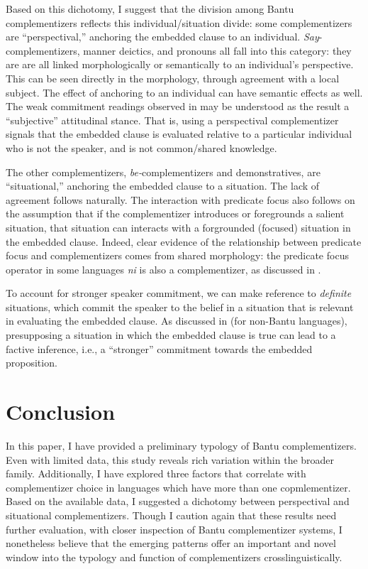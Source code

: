\documentclass[output=paper,colorlinks,citecolor=brown,
]{langscibook}
\begin{document}
Based on this dichotomy, I suggest that the division among Bantu complementizers reflects this individual/situation divide: some complementizers are ``perspectival,'' anchoring the embedded clause to an individual. \textit{Say}-complementizers, manner deictics, and pronouns all fall into this category: they are are all linked morphologically or semantically to an individual's perspective. This can be seen directly in the morphology, through agreement with a local subject. The effect of anchoring to an individual can have semantic effects as well. The weak commitment readings observed in  may be understood as  the result a ``subjective'' attitudinal stance. That is, using a perspectival complementizer signals that the embedded clause is evaluated relative to a particular individual who is not the speaker, and is not common/shared knowledge. 

The other complementizers, \textit{be-}complementizers and demonstratives, are ``situational,'' anchoring the embedded clause to a situation. The lack of agreement follows naturally. The interaction with predicate focus also follows on the assumption that if the complementizer introduces or foregrounds  a salient situation, that situation  can interacts with a forgrounded (focused) situation in the embedded clause. Indeed, clear evidence of the relationship between predicate focus and  complementizers comes from shared morphology: the predicate focus operator in some languages \textit{ni} is also a complementizer, as discussed in .



To account for stronger speaker commitment, we can make reference to \textit{definite} situations, which commit the speaker to the belief in a situation that is relevant in evaluating the embedded clause. As discussed in \citet{Ozyildiz:2017, BochnakHanink:2021} (for non-Bantu languages), presupposing a situation in which the embedded clause is true can lead to a factive inference, i.e., a ``stronger'' commitment towards the embedded proposition.

\section{Conclusion}\label{sec:gluckman:conclusion}

In this paper, I have provided a preliminary typology of Bantu complementizers. Even with limited data, this study reveals rich variation within the broader family. Additionally, I have explored three factors that correlate with complementizer choice in languages which have more than one copmlementizer. Based on the available data, I  suggested a dichotomy between perspectival and situational complementizers. Though I caution again that these results need further evaluation, with closer inspection of Bantu complementizer systems, I nonetheless believe that the emerging patterns offer an important and novel window into the typology and function of complementizers crosslinguistically. 
\end{document}
